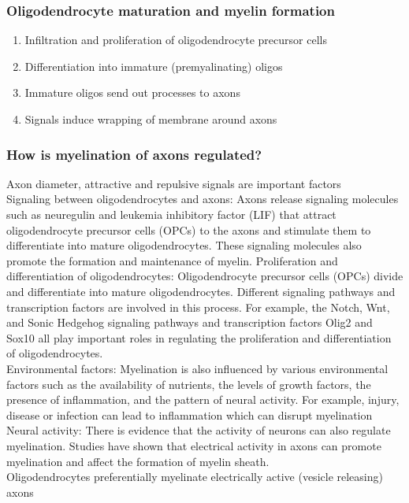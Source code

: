 \begin{itemize}
\begin{itemize}
\subsubsection{Oligodendrocyte maturation and myelin formation}
\begin{enumerate}
    \item Infiltration and proliferation of oligodendrocyte precursor cells
    \item Differentiation into immature (premyalinating) oligos
    \item Immature oligos send out processes to axons
    \item Signals induce wrapping of membrane around axons
\end{enumerate}

\subsubsection{How is myelination of axons regulated?}
Axon diameter, attractive and repulsive signals are important factors
\\Signaling between oligodendrocytes and axons: Axons release signaling molecules such as neuregulin and leukemia inhibitory factor (LIF) that attract oligodendrocyte precursor cells (OPCs) to the axons and stimulate them to differentiate into mature oligodendrocytes. These signaling molecules also promote the formation and maintenance of myelin.
Proliferation and differentiation of oligodendrocytes: Oligodendrocyte precursor cells (OPCs) divide and differentiate into mature oligodendrocytes. 
Different signaling pathways and transcription factors are involved in this process. For example, the Notch, Wnt, and Sonic Hedgehog signaling pathways and transcription factors Olig2 and Sox10 all play important roles in regulating the proliferation and differentiation of oligodendrocytes.
\\Environmental factors: Myelination is also influenced by various environmental factors such as the availability of nutrients, the levels of growth factors, the presence of inflammation, and the pattern of neural activity. For example, injury, disease or infection can lead to inflammation which can disrupt myelination
\\Neural activity: There is evidence that the activity of neurons can also regulate myelination. Studies have shown that electrical activity in axons can promote myelination and affect the formation of myelin sheath.
\\Oligodendrocytes preferentially myelinate electrically active (vesicle releasing) axons

\end{itemize}
\end{itemize}
